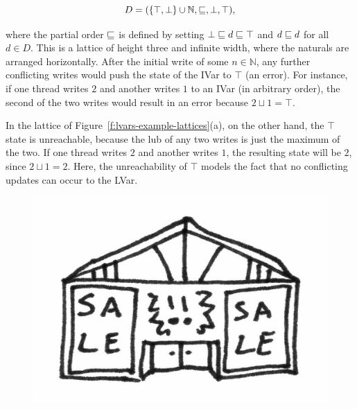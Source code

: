 \vspace{-8mm}
\singlespacing
\begin{displaymath}
  D = (\lbrace \top, \bot \rbrace \cup \mathbb{N}, \sqsubseteq, \bot, \top), 
\end{displaymath}
\doublespacing

where the partial order $\sqsubseteq$ is defined by setting $\bot
\sqsubseteq d \sqsubseteq \top$ and $d \sqsubseteq d$ for all $d \in D$.  This
is a lattice of height three and infinite width, where the naturals
are arranged horizontally.  After the initial write of some $n \in
\mathbb{N}$, any further conflicting writes would push the state of
the IVar to $\top$ (an error).  For instance, if one thread writes $2$
and another writes $1$ to an IVar (in arbitrary order), the second of
the two writes would result in an error because $2 \sqcup 1 = \top$.

In the lattice of Figure~\ref{f:lvars-example-lattices}(a), on the
other hand, the $\top$ state is unreachable, because the lub of any
two writes is just the maximum of the two.  If one thread writes $2$
and another writes $1$, the resulting state will be $2$, since $2
\sqcup 1 = 2$.  Here, the unreachability of $\top$ models the fact
that no conflicting updates can occur to the LVar.

\ifdefined\DISSERTATION
\begin{figure}
\vspace{-2em}
\begin{center}
  \includegraphics[scale=0.15]{../illustrations/store}
\end{center}
\vspace{-2em}
\end{figure}
\fi

